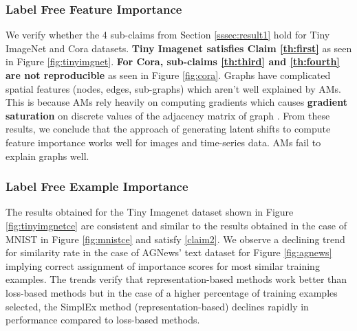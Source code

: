 \subsubsection{Label Free Feature Importance}
\label{sec:result1extra}
    We verify whether the 4 sub-claims from Section \ref{sssec:result1} hold for Tiny ImageNet and Cora datasets.
    \textbf{Tiny Imagenet satisfies Claim \ref{th:first}} as seen in Figure \ref{fig:tinyimgnet}. \textbf{For Cora, sub-claims \ref{th:third} and \ref{th:fourth} are not reproducible} as seen in Figure \ref{fig:cora}. Graphs have complicated spatial features (nodes, edges, sub-graphs) which aren't well explained by AMs. This is because AMs rely heavily on computing gradients  which causes \textbf{gradient saturation} on discrete values of the adjacency matrix of graph \citep{gnnpaper}. 
    From these results, we conclude that the approach of generating latent shifts to compute feature importance works  well for images and time-series data. AMs fail to explain graphs well. 
    
\subsubsection{Label Free Example Importance}\label{sec:result2extra}
The results obtained for the Tiny Imagenet dataset shown in Figure \ref{fig:tinyimgnetce} are consistent and similar to the results obtained in the case of MNIST in Figure \ref{fig:mnistce} and satisfy \ref{claim2}. We  observe a declining trend for similarity rate in the case of AGNews' text dataset for Figure \ref{fig:agnews} implying correct assignment of importance scores for most similar training examples. The trends verify that representation-based methods work better than loss-based methods but in the case of a higher percentage of training examples selected, the SimplEx method (representation-based) declines rapidly in performance compared to loss-based methods.

